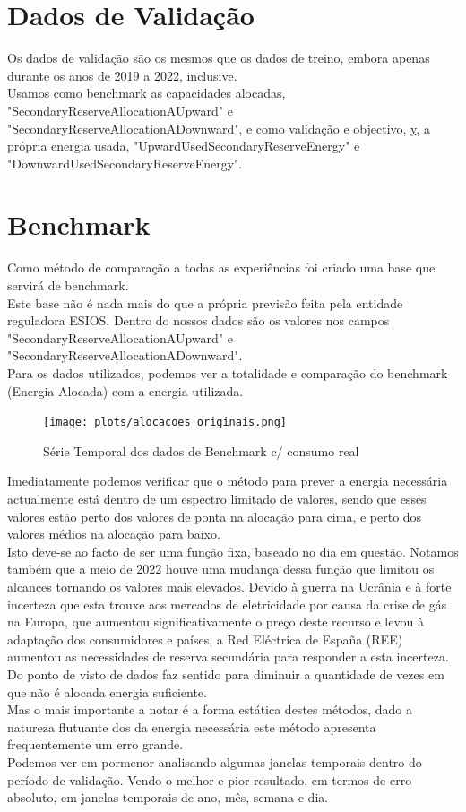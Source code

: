 \section{Dados de Validação}
Os dados de validação são os mesmos que os dados de treino, embora apenas durante os anos de 2019 a 2022, inclusive.\\
Usamos como benchmark as capacidades alocadas, "SecondaryReserveAllocationAUpward" e "SecondaryReserveAllocationADownward", e como validação e objectivo, \hyperref[se:metneuralnet]{y}, a própria energia usada, "UpwardUsedSecondaryReserveEnergy" e "DownwardUsedSecondaryReserveEnergy".

\section{Benchmark}

Como método de comparação a todas as experiências foi criado uma base que servirá de benchmark.\\
Este base não é nada mais do que a própria previsão feita pela entidade reguladora ESIOS. Dentro do nossos dados são os valores nos campos "SecondaryReserveAllocationAUpward" e "SecondaryReserveAllocationADownward".\\
Para os dados utilizados, podemos ver a totalidade e comparação do benchmark (Energia Alocada) com a energia utilizada.\\

\begin{figure}[H]
    \centering
    \texttt{[image: plots/alocacoes\_originais.png]}
    \caption{Série Temporal dos dados de Benchmark c/ consumo real}
    \label{fig:benchmarktimeseries}
\end{figure}

Imediatamente podemos verificar que o método para prever a energia necessária actualmente está dentro de um espectro limitado de valores, sendo que esses valores estão perto dos valores de ponta na alocação para cima, e perto dos valores médios na alocação para baixo.\\
Isto deve-se ao facto de ser uma função fixa, baseado no dia em questão. Notamos também que a meio de 2022 houve uma mudança dessa função que limitou os alcances tornando os valores mais elevados. Devido à guerra na Ucrânia e à forte incerteza que esta trouxe aos mercados de eletricidade por causa da crise de gás na Europa, que aumentou significativamente o preço deste recurso e levou à adaptação dos consumidores e países, a Red Eléctrica de España (REE) aumentou as necessidades de reserva secundária para responder a esta incerteza.\\
Do ponto de visto de dados faz sentido para diminuir a quantidade  de vezes em que não é alocada energia suficiente.\\
Mas o mais importante a notar é a forma estática destes métodos, dado a natureza flutuante dos da energia necessária este método apresenta frequentemente um erro grande.\\
Podemos ver em pormenor analisando algumas janelas temporais dentro do período de validação. Vendo o melhor e pior resultado, em termos de erro absoluto, em janelas temporais de ano, mês, semana e dia.\\


